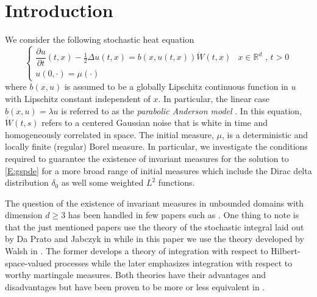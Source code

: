 \documentclass[a4paper,11pt]{article}%
\numberwithin{equation}{section}
\theoremstyle{plain}
\theoremstyle{definition}
\newcommand{\R}{\mathbb{R}}
\begin{document}
\section{Introduction}
We consider the following stochastic heat equation
\begin{equation}
	\begin{cases}
	\dfrac{\partial u}{\partial t}(t,x)-\frac{1}{2}\Delta u(t,x) = b(x,u(t,x))\dot W(t,x) & \text{$x\in \R^d$ , $t>0$} \\
	u(0,\cdot) = \mu(\cdot)  &
	\end{cases}  \label{E:gspde}
\end{equation}
where $b(x,u)$ is assumed to be a globally Lipschitz continuous function in $u$ with Lipschitz constant independent of $x$.
In particular, the linear case  $b(x,u) = \lambda u$ is referred to as the \textit{parabolic Anderson model} \cite{CarMol94}.
In this equation, $\dot{W}(t,s)$ refers to a centered Gaussian noise that is white in time and homogeneously correlated in space.
The initial measure, $\mu$, is a deterministic and locally finite (regular) Borel measure.
In particular, we investigate the conditions required to guarantee the existence of invariant measures
for the solution to \eqref{E:gspde} for a more broad range of initial measures which include the Dirac delta
distribution $\delta_0$ as well some weighted $L^2$ functions.

The question of the existence of invariant measures in unbounded domains with dimension $d \ge 3$ has been handled in
few papers such as \cite{TessitoreZabczyk98M, AM03, MSY15, MSY16}. One thing to note is that the just mentioned papers
use the theory of the stochastic integral laid out by Da Prato and Jabczyk in \cite{DZ92} while in this paper we use the
theory developed by Walsh in \cite{Walsh}. The former develops a theory of integration with respect to
Hilbert-space-valued processes while the later emphasizes integration with respect to worthy martingale measures. Both
theories have their advantages and disadvantages but have been proven to be more or less equivalent in \cite{DalQuer}.
\end{document}
